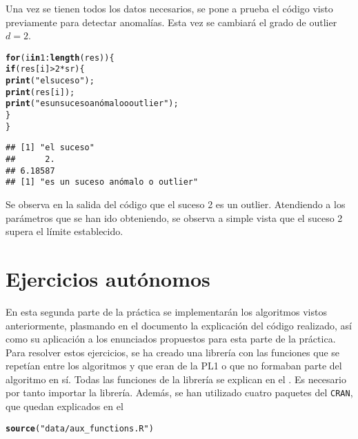 \documentclass[12pt]{report}\usepackage[]{graphicx}\usepackage[dvipsnames]{xcolor}
\makeatletter
\newcommand{\hlnum}[1]{\textcolor[rgb]{0.686,0.059,0.569}{#1}}%
\newcommand{\hlstr}[1]{\textcolor[rgb]{0.192,0.494,0.8}{#1}}%
\newcommand{\hlopt}[1]{\textcolor[rgb]{0,0,0}{#1}}%
\newcommand{\hlstd}[1]{\textcolor[rgb]{0.345,0.345,0.345}{#1}}%
\newcommand{\hlkwa}[1]{\textcolor[rgb]{0.161,0.373,0.58}{\textbf{#1}}}%
\newcommand{\hlkwd}[1]{\textcolor[rgb]{0.737,0.353,0.396}{\textbf{#1}}}%
\newenvironment{kframe}{%
 \def\at@end@of@kframe{}%
 \ifinner\ifhmode%
  \def\at@end@of@kframe{\end{minipage}}%
  \begin{minipage}{\columnwidth}%
 \fi\fi%
 \def\FrameCommand##1{\hskip\@totalleftmargin \hskip-\fboxsep
 \colorbox{shadecolor}{##1}\hskip-\fboxsep
     \hskip-\linewidth \hskip-\@totalleftmargin \hskip\columnwidth}%
 \MakeFramed {\advance\hsize-\width
   \@totalleftmargin\z@ \linewidth\hsize
   \@setminipage}}%
 {\par\unskip\endMakeFramed%
 \at@end@of@kframe}
\newenvironment{knitrout}{}{} %
\makeatother
\begin{document}
			 Una vez se tienen todos los datos necesarios, se pone a prueba el código visto previamente para detectar anomalías. Esta vez se cambiará el grado de outlier $d = 2$.
			 
\begin{knitrout}
\color{fgcolor}\begin{kframe}
\begin{alltt}
\hlkwa{for} \hlstd{(i} \hlkwa{in} \hlnum{1}\hlopt{:}\hlkwd{length}\hlstd{(res))\{}
        \hlkwa{if}\hlstd{(res[i]}\hlopt{>}\hlnum{2}\hlopt{*}\hlstd{sr)\{}
                \hlkwd{print}\hlstd{(}\hlstr{"el suceso"}\hlstd{);}
                \hlkwd{print}\hlstd{(res[i]);}
                \hlkwd{print}\hlstd{(}\hlstr{"es un suceso anómalo o outlier"}\hlstd{);}
                                 \hlstd{\}}
\hlstd{\}}
\end{alltt}
\begin{verbatim}
## [1] "el suceso"
##      2. 
## 6.18587 
## [1] "es un suceso anómalo o outlier"
\end{verbatim}
\end{kframe}
\end{knitrout}
			 
			 Se observa en la salida del código que el suceso 2 es un outlier. Atendiendo a los parámetros que se han ido obteniendo, se observa a simple vista que el suceso 2 supera el límite establecido. 
	 
	 \chapter{Ejercicios autónomos}
	 
		 En esta segunda parte de la práctica se implementarán los algoritmos vistos anteriormente, plasmando en el documento la explicación del código realizado, así como su aplicación a los enunciados propuestos para esta parte de la práctica. Para resolver estos ejercicios, se ha creado una librería con las funciones que se repetían entre los algoritmos y que eran de la PL1 o que no formaban parte del algoritmo en sí. Todas las funciones de la librería se explican en el . Es necesario por tanto importar la librería. Además, se han utilizado cuatro paquetes del \texttt{CRAN}, que quedan explicados en el 
		 
\begin{knitrout}
\color{fgcolor}\begin{kframe}
\begin{alltt}
\hlkwd{source}\hlstd{(}\hlstr{"data/aux_functions.R"}\hlstd{)}
\end{alltt}
\end{kframe}
\end{knitrout}
		 
\end{document}
